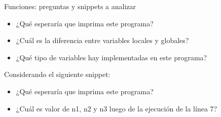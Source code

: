 \documentclass[xcolor=pdftex,table,11pt]{beamer}
\begin{document}
\begin{frame}[allowframebreaks]{Funciones: preguntas y snippets a analizar}
\begin{itemize}
\item ¿Qué esperaría que imprima este programa?

\item ¿Cuál es la diferencia entre variables locales y globales?

\item ¿Qué tipo de variables hay implementadas en este programa?

\end{itemize}

\newpage
Considerando el siguiente snippet:

\codesetstylefrombeamer
{}


\begin{itemize}

\item ¿Qué esperaría que imprima este programa?

\item ¿Cuál es valor de n1, n2 y n3 luego de la ejecución de la línea 7?

\end{itemize}


\end{frame}
\end{document}
